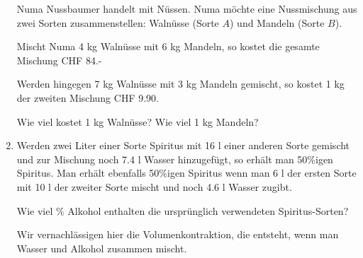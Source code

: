 \begin{enumerate}[label=\alph*)]
Numa Nussbaumer handelt mit Nüssen. Numa möchte eine Nussmischung aus zwei
Sorten zusammenstellen: Walnüsse (Sorte $A$) und Mandeln (Sorte $B$).

Mischt Numa 4 kg Walnüsse mit 6 kg Mandeln, so kostet die gesamte
Mischung CHF 84.-

Werden hingegen 7 kg Walnüsse mit 3 kg Mandeln gemischt, so kostet 1
kg der zweiten Mischung CHF 9.90.

Wie viel kostet 1 kg Walnüsse? Wie viel 1 kg Mandeln?


\item
Werden zwei Liter einer Sorte Spiritus mit 16 l einer anderen Sorte
gemischt und zur Mischung noch 7.4 l Wasser hinzugefügt, so erhält man
50\%igen Spiritus. Man erhält ebenfalls 50\%igen Spiritus wenn man 6 l
der ersten Sorte mit 10 l der zweiter Sorte mischt und noch 4.6 l
Wasser zugibt.

Wie viel \% Alkohol enthalten die ursprünglich verwendeten
Spiritus-Sorten?

Wir vernachlässigen hier die Volumenkontraktion, die entsteht, wenn man
Wasser und Alkohol zusammen mischt.


\end{enumerate}\newpage

